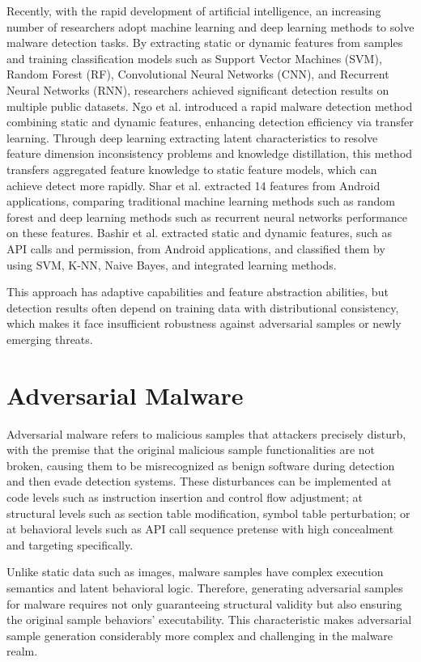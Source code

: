 Recently, with the rapid development of artificial intelligence, an increasing number of researchers adopt machine learning and deep learning methods to solve malware detection tasks. By extracting static or dynamic features from samples and training classification models such as Support Vector Machines (SVM), Random Forest (RF), Convolutional Neural Networks (CNN), and Recurrent Neural Networks (RNN), researchers achieved significant detection results on multiple public datasets. Ngo et al. introduced a rapid malware detection method combining static and dynamic features, enhancing detection efficiency via transfer learning\cite{ngo2023fast}. Through deep learning extracting latent characteristics to resolve feature dimension inconsistency problems and knowledge distillation, this method transfers aggregated feature knowledge to static feature models, which can achieve detect more rapidly. Shar et al. extracted 14 features from Android applications, comparing traditional machine learning methods such as random forest and deep learning methods such as recurrent neural networks performance on these features\cite{shar2023experimental}. Bashir et al. extracted static and dynamic features, such as API calls and permission, from Android applications, and classified them by using SVM, K-NN, Naive Bayes, and integrated learning methods\cite{bashir2024hybrid}.

This approach has adaptive capabilities and feature abstraction abilities, but detection results often depend on training data with distributional consistency, which makes it face insufficient robustness against adversarial samples or newly emerging threats.  

\section{Adversarial Malware}

Adversarial malware refers to malicious samples that attackers precisely disturb, with the premise that the original malicious sample functionalities are not broken, causing them to be misrecognized as benign software during detection and then evade detection systems. These disturbances can be implemented at code levels such as instruction insertion and control flow adjustment; at structural levels such as section table modification, symbol table perturbation; or at behavioral levels such as API call sequence pretense with high concealment and targeting specifically.

Unlike static data such as images, malware samples have complex execution semantics and latent behavioral logic. Therefore, generating adversarial samples for malware requires not only guaranteeing structural validity but also ensuring the original sample behaviors' executability. This characteristic makes adversarial sample generation considerably more complex and challenging in the malware realm.

